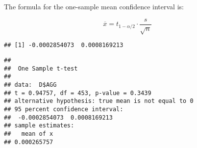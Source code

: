 \documentclass[
]{article}
\newenvironment{Shaded}{\begin{snugshade}}{\end{snugshade}}
\newcommand{\AttributeTok}[1]{\textcolor[rgb]{0.77,0.63,0.00}{#1}}
\newcommand{\CommentTok}[1]{\textcolor[rgb]{0.56,0.35,0.01}{\textit{#1}}}
\newcommand{\DecValTok}[1]{\textcolor[rgb]{0.00,0.00,0.81}{#1}}
\newcommand{\FloatTok}[1]{\textcolor[rgb]{0.00,0.00,0.81}{#1}}
\newcommand{\FunctionTok}[1]{\textcolor[rgb]{0.00,0.00,0.00}{#1}}
\newcommand{\NormalTok}[1]{#1}
\newcommand{\OtherTok}[1]{\textcolor[rgb]{0.56,0.35,0.01}{#1}}
\newcommand{\SpecialCharTok}[1]{\textcolor[rgb]{0.00,0.00,0.00}{#1}}
\begin{document}
The formula for the one-sample mean confidence interval is:

\[ \overline{x} = t_{1-\alpha /2} \cdot \frac{s}{\sqrt{n}} \]

\begin{Shaded}
\end{Shaded}

\begin{verbatim}
## [1] -0.0002854073  0.0008169213
\end{verbatim}

\begin{Shaded}
\end{Shaded}

\begin{verbatim}
## 
##  One Sample t-test
## 
## data:  D$AGG
## t = 0.94757, df = 453, p-value = 0.3439
## alternative hypothesis: true mean is not equal to 0
## 95 percent confidence interval:
##  -0.0002854073  0.0008169213
## sample estimates:
##   mean of x 
## 0.000265757
\end{verbatim}

\begin{Shaded}
\end{Shaded}
\end{document}

